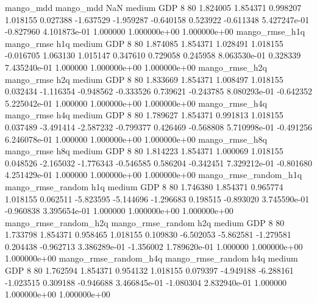             mango_mdd         mango_mdd                  NaN     medium      GDP                 8 80  1.824005       1.854371 0.998207       1.018155    0.027388     -1.637529     -1.959287    -0.640158       0.523922 -0.611348 5.427247e-01    -0.827960   4.101873e-01            1.000000    1.000000e+00        1.000000e+00
       mango_rmse_h1q        mango_rmse                  h1q     medium      GDP                 8 80  1.874085       1.854371 1.028491       1.018155   -0.016705      1.063130      1.015147     0.347610       0.729058  0.245958 8.063530e-01     0.328339   7.435240e-01            1.000000    1.000000e+00        1.000000e+00
       mango_rmse_h2q        mango_rmse                  h2q     medium      GDP                 8 80  1.833669       1.854371 1.008497       1.018155    0.032434     -1.116354     -0.948562    -0.333526       0.739621 -0.243785 8.080293e-01    -0.642352   5.225042e-01            1.000000    1.000000e+00        1.000000e+00
       mango_rmse_h4q        mango_rmse                  h4q     medium      GDP                 8 80  1.789627       1.854371 0.991813       1.018155    0.037489     -3.491414     -2.587232    -0.799377       0.426469 -0.568808 5.710998e-01    -0.491256   6.246078e-01            1.000000    1.000000e+00        1.000000e+00
       mango_rmse_h8q        mango_rmse                  h8q     medium      GDP                 8 80  1.814223       1.854371 1.000069       1.018155    0.048526     -2.165032     -1.776343    -0.546585       0.586204 -0.342451 7.329212e-01    -0.801680   4.251429e-01            1.000000    1.000000e+00        1.000000e+00
mango_rmse_random_h1q mango_rmse_random                  h1q     medium      GDP                 8 80  1.746380       1.854371 0.965774       1.018155    0.062511     -5.823595     -5.144696    -1.296683       0.198515 -0.893020 3.745590e-01    -0.960838   3.395654e-01            1.000000    1.000000e+00        1.000000e+00
mango_rmse_random_h2q mango_rmse_random                  h2q     medium      GDP                 8 80  1.733798       1.854371 0.958465       1.018155    0.109830     -6.502053     -5.862581    -1.279581       0.204438 -0.962713 3.386289e-01    -1.356002   1.789620e-01            1.000000    1.000000e+00        1.000000e+00
mango_rmse_random_h4q mango_rmse_random                  h4q     medium      GDP                 8 80  1.762594       1.854371 0.954132       1.018155    0.079397     -4.949188     -6.288161    -1.023515       0.309188 -0.946688 3.466845e-01    -1.080304   2.832940e-01            1.000000    1.000000e+00        1.000000e+00
